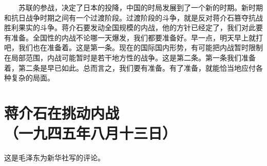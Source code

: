 \documentclass[cn,11pt,chinese]{elegantbook}
\def\myformat#1{\hfil\hfil #1}
\begin{document}
　　苏联的参战，决定了日本的投降，中国的时局发展到了一个新的时期。新时期和抗日战争时期之间有一个过渡阶段。过渡阶段的斗争，就是反对蒋介石篡夺抗战胜利果实的斗争。蒋介石要发动全国规模的内战，他的方针已经定了，我们对此要有准备。全国性的内战不论哪一天爆发，我们都要准备好。早一点，明天早上就打吧，我们也在准备着。这是第一条。现在的国际国内形势，有可能把内战暂时限制在局部范围，内战可能暂时是若干地方性的战争。这是第二条。第一条我们准备着，第二条是早已如此。总而言之，我们要有准备。有了准备，就能恰当地应付各种复杂的局面。\\
\newpage\section*{\myformat{蒋介石在挑动内战}\\\myformat{（一九四五年八月十三日）}}
\begin{introduction}\item  这是毛泽东为新华社写的评论。\end{introduction}
\end{document}
